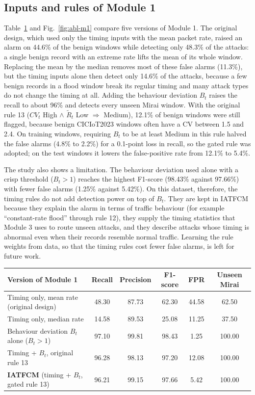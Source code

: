 \documentclass[]{interact}
\theoremstyle{plain}
\theoremstyle{definition}
\begin{document}
\subsection{Inputs and rules of Module 1}\label{sec:abl-m1}
Table~\ref{tab:abl-m1} and Fig.~\ref{fig:abl-m1} compare five versions of Module 1. The original design, which used only the timing inputs with the mean packet rate, raised an alarm on 44.6\% of the benign windows while detecting only 48.3\% of the attacks: a single benign record with an extreme rate lifts the mean of its whole window. Replacing the mean by the median removes most of these false alarms (11.3\%), but the timing inputs alone then detect only 14.6\% of the attacks, because a few benign records in a flood window break its regular timing and many attack types do not change the timing at all. Adding the behaviour deviation $B_t$ raises the recall to about 96\% and detects every unseen Mirai window. With the original rule 13 ($CV_t$ High $\wedge$ $\tilde{R}_t$ Low $\Rightarrow$ Medium), 12.1\% of benign windows were still flagged, because benign CICIoT2023 windows often have a CV between 1.5 and 2.4. On training windows, requiring $B_t$ to be at least Medium in this rule halved the false alarms (4.8\% to 2.2\%) for a 0.1-point loss in recall, so the gated rule was adopted; on the test windows it lowers the false-positive rate from 12.1\% to 5.4\%.

The study also shows a limitation. The behaviour deviation used alone with a crisp threshold ($B_t > 1$) reaches the highest F1-score (98.43\% against 97.66\%) with fewer false alarms (1.25\% against 5.42\%). On this dataset, therefore, the timing rules do not add detection power on top of $B_t$. They are kept in IATFCM because they explain the alarm in terms of traffic behaviour (for example ``constant-rate flood'' through rule 12), they supply the timing statistics that Module 3 uses to route unseen attacks, and they describe attacks whose timing is abnormal even when their records resemble normal traffic. Learning the rule weights from data, so that the timing rules cost fewer false alarms, is left for future work.

\begin{table}[htbp]
{\small
\begin{tabular}{lccccc}
\toprule
Version of Module 1 & Recall & Precision & F1-score & FPR & Unseen Mirai \\
\midrule
Timing only, mean rate (original design)  & 48.30 & 87.73 & 62.30 & 44.58 & 62.50 \\
Timing only, median rate                  & 14.58 & 89.53 & 25.08 & 11.25 & 37.50 \\
Behaviour deviation $B_t$ alone ($B_t > 1$) & 97.10 & 99.81 & 98.43 & 1.25 & 100.00 \\
Timing + $B_t$, original rule 13          & 96.28 & 98.13 & 97.20 & 12.08 & 100.00 \\
\textbf{IATFCM} (timing + $B_t$, gated rule 13) & 96.21 & 99.15 & 97.66 & 5.42 & 100.00 \\
\bottomrule
\end{tabular}}
\label{tab:abl-m1}
\end{table}
\end{document}
